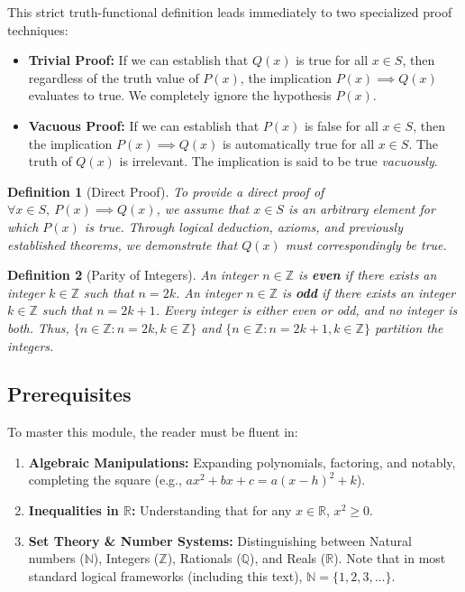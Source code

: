 \documentclass[11pt]{article}
\newtheorem{definition}{Definition}[section]
\theoremstyle{remark}
\begin{document}
This strict truth-functional definition leads immediately to two specialized proof techniques:
\begin{itemize}
    \item \textbf{Trivial Proof:} If we can establish that $Q(x)$ is true for all $x \in S$, then regardless of the truth value of $P(x)$, the implication $P(x) \implies Q(x)$ evaluates to true. We completely ignore the hypothesis $P(x)$.
    \item \textbf{Vacuous Proof:} If we can establish that $P(x)$ is false for all $x \in S$, then the implication $P(x) \implies Q(x)$ is automatically true for all $x \in S$. The truth of $Q(x)$ is irrelevant. The implication is said to be true \textit{vacuously}.
\end{itemize}

\begin{definition}[Direct Proof]
To provide a direct proof of $\forall x \in S, \ P(x) \implies Q(x)$, we assume that $x \in S$ is an arbitrary element for which $P(x)$ is true. Through logical deduction, axioms, and previously established theorems, we demonstrate that $Q(x)$ must correspondingly be true.
\end{definition}

\begin{definition}[Parity of Integers]
An integer $n \in \mathbb{Z}$ is \textbf{even} if there exists an integer $k \in \mathbb{Z}$ such that $n = 2k$.
An integer $n \in \mathbb{Z}$ is \textbf{odd} if there exists an integer $k \in \mathbb{Z}$ such that $n = 2k + 1$.
Every integer is either even or odd, and no integer is both. Thus, $\{n \in \mathbb{Z} : n = 2k, k \in \mathbb{Z}\}$ and $\{n \in \mathbb{Z} : n = 2k+1, k \in \mathbb{Z}\}$ partition the integers.
\end{definition}

\subsection{Prerequisites}
To master this module, the reader must be fluent in:
\begin{enumerate}
    \item \textbf{Algebraic Manipulations:} Expanding polynomials, factoring, and notably, completing the square (e.g., $ax^2 + bx + c = a(x-h)^2 + k$).
    \item \textbf{Inequalities in $\mathbb{R}$:} Understanding that for any $x \in \mathbb{R}$, $x^2 \ge 0$.
    \item \textbf{Set Theory \& Number Systems:} Distinguishing between Natural numbers ($\mathbb{N}$), Integers ($\mathbb{Z}$), Rationals ($\mathbb{Q}$), and Reals ($\mathbb{R}$). Note that in most standard logical frameworks (including this text), $\mathbb{N} = \{1, 2, 3, \dots\}$.
\end{enumerate}
\end{document}
